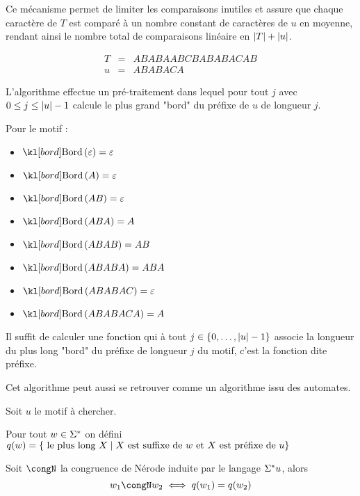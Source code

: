 Ce mécanisme permet de limiter les comparaisons inutiles et assure que chaque caractère de $T$
est comparé à un nombre constant de caractères de $u$ en moyenne, rendant ainsi le nombre total
de comparaisons linéaire en $|T| + |u|$.


\begin{exemple}
	\begin{eqnarray*}
		T &=& ABABAABCBABABACAB \\
		u &=& ABABACA
	\end{eqnarray*}
\end{exemple}


L'algorithme effectue un pré-traitement dans lequel pour tout $j$ avec $0 \leq j \leq |u| - 1$
calcule le plus grand "bord" du préfixe de $u$ de longueur $j$.

\begin{exemple}
	Pour le motif :

	\begin{itemize}
		\item $\Bord {\motvide} = \motvide$
		\item $\Bord A = \motvide$
		\item $\Bord {AB} = \motvide$
		\item $\Bord {ABA} = A$
		\item $\Bord {ABAB} = AB$
		\item $\Bord {ABABA} = ABA$
		\item $\Bord {ABABAC} = \motvide$
		\item $\Bord {ABABACA} = A$
	\end{itemize}
\end{exemple}

Il suffit de calculer une fonction qui à tout $j \in \left\{0,\ldots,|u| - 1\right\}$ associe
la longueur du plus long "bord" du préfixe de longueur $j$ du motif, c'est la fonction dite préfixe.


Cet algorithme peut aussi se retrouver comme un algorithme issu des automates.

Soit $u$ le motif à chercher.

\begin{definition}
	Pour tout $w \in \Sigma^{*}$ on défini
	$q(w) = \left\{\text{ le plus long } X \mid X \text{ est suffixe de } w \text{ et } X \text{ est préfixe de } u\right\}$
\end{definition}

\begin{prop}
	Soit $\congN$ la congruence de Nérode induite par le langage $\Sigma^{*} u$, alors
	$$ w_1 \congN w_2 \iff q(w_1) = q(w_2)$$
\end{prop}

